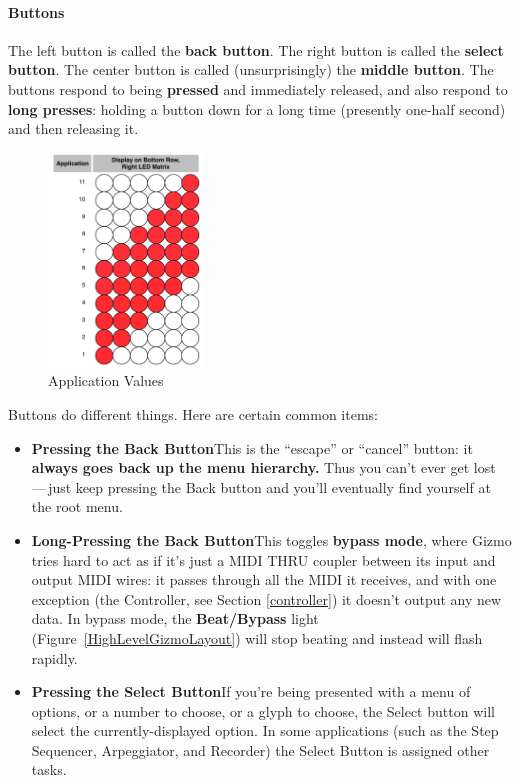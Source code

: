 \documentclass{article}
\begin{document}
\paragraph{Buttons}  The left button is called the {\bf back button}.  The right button is called the {\bf select button}.  The center button is called (unsurprisingly) the {\bf middle button}.   The buttons respond to being {\bf pressed} and immediately released, and also respond to {\bf long presses}: holding a button down for a long time (presently one-half second) and then releasing it. 

\begin{figure}
\includegraphics[width=1.6in]{Application.pdf}
\vspace{-2em}\caption{\small Application Values}\vspace{-4em}
\label{applicationvalues}
\end{figure}

Buttons do different things.  Here are certain common items:

\begin{itemize}
\item {\bf Pressing the Back Button}\quad This is the ``escape'' or ``cancel'' button: it {\bf always goes back up the menu hierarchy.}  Thus you can't ever get lost\,---\,just keep pressing the Back button and you'll eventually find yourself at the root menu.
\item {\bf Long-Pressing the Back Button}\quad This toggles {\bf bypass mode}, where Gizmo tries hard to act as if it's just a MIDI THRU coupler between its input and output MIDI wires: it passes through all the MIDI it receives, and with one exception (the Controller, see Section \ref{controller}) it doesn't output any new data.  In bypass mode, the {\bf Beat/Bypass} light (Figure~\ref{HighLevelGizmoLayout}) will stop beating and instead will flash rapidly.
\item {\bf Pressing the Select Button}\quad If you're being presented with a menu of options, or a number to choose, or a glyph to choose, the Select button will select the currently-displayed option.  In some applications (such as the Step Sequencer, Arpeggiator, and Recorder) the Select Button is assigned other tasks.
\end{itemize}
\end{document}
